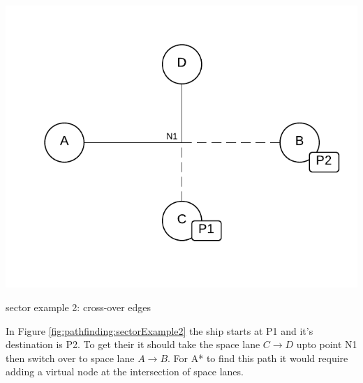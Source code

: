 \begin{marginfigure}
	\includegraphics{res/pathfinding/PathFindingSector2.pdf}
    \caption{sector example 2: cross-over edges}
	\label{fig:pathfinding:sectorExample2}
\end{marginfigure}
In Figure \ref{fig:pathfinding:sectorExample2} the ship starts at P1 and it's destination is P2.
To get their it should take the space lane $C \to D$ upto point N1 then switch over to space lane $A \to B$.
For A* to find this path it would require adding a virtual node at the intersection of space lanes.

